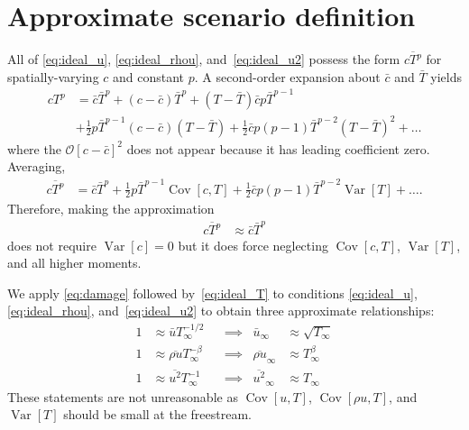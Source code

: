 \documentclass[letterpaper,11pt,nointlimits,reqno]{amsart}
\newcommand{\Cov}[2]{\ensuremath{\operatorname{Cov}\left[{#1},{#2}\right]}}
\newcommand{\Var}[1]{\ensuremath{\operatorname{Var}\left[{#1}\right]}}
\begin{document}
\section{Approximate scenario definition}

All of \eqref{eq:ideal_u}, \eqref{eq:ideal_rhou}, and~\eqref{eq:ideal_u2}
possess the form $\overline{c T^p}$ for spatially-varying $c$ and constant $p$.
A second-order expansion about $\bar{c}$ and $\bar{T}$ yields
\begin{align}
  c T^p &= \bar{c} \bar{T}^p
         + \left(c - \bar{c}\right) \bar{T}^p
         + \left(T - \bar{T}\right) \bar{c} p \bar{T}^{p-1}
\\      &+ \frac{1}{2} p \bar{T}^{p-1} \left(c - \bar{c}\right)\left(T - \bar{T}\right)
         + \frac{1}{2} \bar{c} p \left(p-1\right) \bar{T}^{p-2} \left(T - \bar{T}\right)^2
         + \dots
\end{align}
where the $\mathcal{O}\left[c - \bar{c}\right]^2$ does not appear because it
has leading coefficient zero.  Averaging,
\begin{align}
  \overline{c T^p} &= \bar{c} \bar{T}^p
                    + \frac{1}{2} p \bar{T}^{p-1} \Cov{c}{T}
                    + \frac{1}{2} \bar{c} p \left(p-1\right) \bar{T}^{p-2} \Var{T}
                    + \dots
.
\end{align}
Therefore, making the approximation
\begin{align}
  \label{eq:damage}
  \overline{c T^p} &\approx \bar{c} \bar{T}^p
\end{align}
does not require $\Var{c} = 0$ but it does force neglecting $\Cov{c}{T}$, $\Var{T}$,
and all higher moments.

We apply \eqref{eq:damage} followed by~\eqref{eq:ideal_T} to conditions
\eqref{eq:ideal_u}, \eqref{eq:ideal_rhou}, and~\eqref{eq:ideal_u2} to obtain
three approximate relationships:
\begin{align}
  \label{eq:approx_u}
  1 &\approx \bar{u} T_\infty^{-1/2}
  & &\implies
  & \bar{u}_\infty &\approx \sqrt{T_\infty}
\\
  \label{eq:approx_rhou}
  1 &\approx \overline{\rho u} T_\infty^{-\beta}
  & &\implies
  & \overline{\rho u}_\infty &\approx T_\infty^\beta
\\
  \label{eq:approx_u2}
  1 &\approx \overline{u^2} T_\infty^{-1}
  & &\implies
  & \overline{u^2}_\infty &\approx T_\infty
\end{align}
These statements are not unreasonable as $\Cov{u}{T}$, $\Cov{\rho u}{T}$, and
$\Var{T}$ should be small at the freestream.
\end{document}
